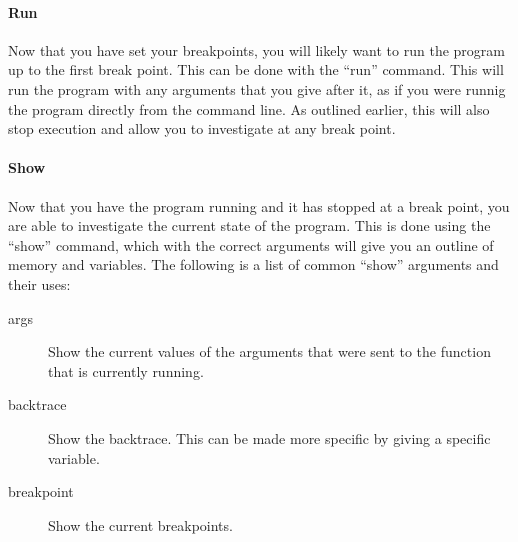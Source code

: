 \documentclass[a4paper,11pt]{report}
\begin{document}
		\paragraph{Run}
		Now that you have set your breakpoints, you will likely want to run the program up to the first break point. 
		This can be done with the ``run'' command.
		This will run the program with any arguments that you give after it, 
		as if you were runnig the program directly from the command line. 
		As outlined earlier, this will also stop execution and allow you to investigate at any break point. 

		\paragraph{Show}
		Now that you have the program running and it has stopped at a break point, 
		you are able to investigate the current state of the program. 
		This is done using the ``show'' command, which with the correct arguments will give you an outline of memory and variables. 
		The following is a list of common ``show'' arguments and their uses:
		\begin{description}
			\item[args] Show the current values of the arguments that were sent to the function that is currently running. 
			\item[backtrace] Show the backtrace. This can be made more specific by giving a specific variable. 
			\item[breakpoint] Show the current breakpoints. 
		\end{description}
\end{document}
